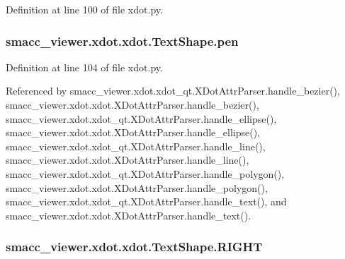 Definition at line 100 of file xdot.\+py.

\subsubsection[{\texorpdfstring{pen}{pen}}]{\setlength{\rightskip}{0pt plus 5cm}smacc\+\_\+viewer.\+xdot.\+xdot.\+Text\+Shape.\+pen}\hypertarget{classsmacc__viewer_1_1xdot_1_1xdot_1_1TextShape_a1b3b342bfa195afb19513d331bc67ebe}{}\label{classsmacc__viewer_1_1xdot_1_1xdot_1_1TextShape_a1b3b342bfa195afb19513d331bc67ebe}


Definition at line 104 of file xdot.\+py.



Referenced by smacc\+\_\+viewer.\+xdot.\+xdot\+\_\+qt.\+X\+Dot\+Attr\+Parser.\+handle\+\_\+bezier(), smacc\+\_\+viewer.\+xdot.\+xdot.\+X\+Dot\+Attr\+Parser.\+handle\+\_\+bezier(), smacc\+\_\+viewer.\+xdot.\+xdot\+\_\+qt.\+X\+Dot\+Attr\+Parser.\+handle\+\_\+ellipse(), smacc\+\_\+viewer.\+xdot.\+xdot.\+X\+Dot\+Attr\+Parser.\+handle\+\_\+ellipse(), smacc\+\_\+viewer.\+xdot.\+xdot\+\_\+qt.\+X\+Dot\+Attr\+Parser.\+handle\+\_\+line(), smacc\+\_\+viewer.\+xdot.\+xdot.\+X\+Dot\+Attr\+Parser.\+handle\+\_\+line(), smacc\+\_\+viewer.\+xdot.\+xdot\+\_\+qt.\+X\+Dot\+Attr\+Parser.\+handle\+\_\+polygon(), smacc\+\_\+viewer.\+xdot.\+xdot.\+X\+Dot\+Attr\+Parser.\+handle\+\_\+polygon(), smacc\+\_\+viewer.\+xdot.\+xdot\+\_\+qt.\+X\+Dot\+Attr\+Parser.\+handle\+\_\+text(), and smacc\+\_\+viewer.\+xdot.\+xdot.\+X\+Dot\+Attr\+Parser.\+handle\+\_\+text().

\subsubsection[{\texorpdfstring{R\+I\+G\+HT}{RIGHT}}]{\setlength{\rightskip}{0pt plus 5cm}smacc\+\_\+viewer.\+xdot.\+xdot.\+Text\+Shape.\+R\+I\+G\+HT\hspace{0.3cm}{\ttfamily [static]}}\hypertarget{classsmacc__viewer_1_1xdot_1_1xdot_1_1TextShape_a76f23b5cec407e24b8eaddbc292a7983}{}\label{classsmacc__viewer_1_1xdot_1_1xdot_1_1TextShape_a76f23b5cec407e24b8eaddbc292a7983}


